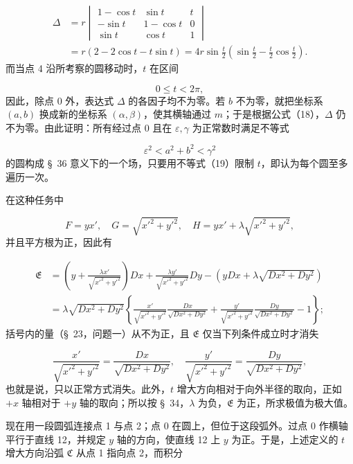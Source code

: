 \documentclass[11pt,a4paper,leqno]{article}
\begin{document}
\[
\begin{aligned}
\Delta&=r\begin{vmatrix}
1-\cos t&\sin t&t\\
-\sin t&1-\cos t&0\\
\sin t&\cos t&1
\end{vmatrix}\\
&=r(2-2\cos t-t\sin t)=4r\sin\frac{t}{2}\left(\sin\frac{t}{2}-\frac{t}{2}\cos\frac{t}{2}\right).
\end{aligned}
\]
而当点 4 沿所考察的圆移动时，$t$ 在区间

\begin{equation}\tag{19}
0\leq t<2\pi,
\end{equation}
因此，除点 0 外，表达式 $\Delta$ 的各因子均不为零。若 $b$ 不为零，就把坐标系 $(a,b)$ 换成新的坐标系 $(\alpha,\beta)$，使其横轴通过 $m$；于是根据公式（18），$\Delta$ 仍不为零。由此证明：所有经过点 0 且在 $\varepsilon,\gamma$ 为正常数时满足不等式

\begin{equation}\tag{20}
\varepsilon^2<a^2+b^2<\gamma^2
\end{equation}
的圆构成 \S~36 意义下的一个场，只要用不等式（19）限制 $t$，即认为每个圆至多遍历一次。

在这种任务中

\[
F=yx',\quad G=\sqrt{x'^2+y'^2},\quad H=yx'+\lambda\sqrt{x'^2+y'^2},
\]
并且平方根为正，因此有

\[
\begin{aligned}
\mathfrak{E}&=\left(y+\frac{\lambda x'}{\sqrt{x'^2+y'^2}}\right)Dx+
\frac{\lambda y'}{\sqrt{x'^2+y'^2}}Dy-
\left(yDx+\lambda\sqrt{Dx^2+Dy^2}\right)\\
&=\lambda\sqrt{Dx^2+Dy^2}\left\{\frac{x'}{\sqrt{x'^2+y'^2}}\frac{Dx}{\sqrt{Dx^2+Dy^2}}+
\frac{y'}{\sqrt{x'^2+y'^2}}\frac{Dy}{\sqrt{Dx^2+Dy^2}}-1\right\};
\end{aligned}
\]
括号内的量（\S~23，问题一）从不为正，且 $\mathfrak{E}$ 仅当下列条件成立时才消失

\[
\frac{x'}{\sqrt{x'^2+y'^2}}=\frac{Dx}{\sqrt{Dx^2+Dy^2}},\quad
\frac{y'}{\sqrt{x'^2+y'^2}}=\frac{Dy}{\sqrt{Dx^2+Dy^2}},
\]
也就是说，只以正常方式消失。此外，$t$ 增大方向相对于向外半径的取向，正如
$+x$ 轴相对于 $+y$ 轴的取向；所以按 \S~34，$\lambda$ 为负，$\mathfrak{E}$ 为正，所求极值为极大值。

现在用一段圆弧连接点 1 与点 2；点 0 在圆上，但位于这段弧外。过点 0 作横轴平行于直线 12，并规定 $y$ 轴的方向，使直线 12 上 $y$ 为正。于是，上述定义的 $t$ 增大方向沿弧 $\mathfrak{C}$ 从点 1 指向点 2，而积分
\end{document}
